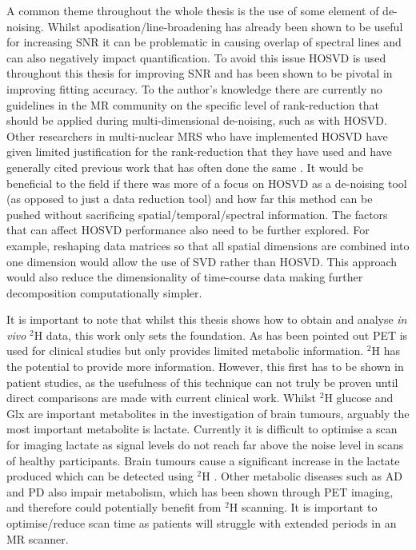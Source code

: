 A common theme throughout the whole thesis is the use of some element of de-noising. Whilst apodisation/line-broadening has already been shown to be useful for increasing \ac{SNR} it can be problematic in causing overlap of spectral lines and can also negatively impact quantification. To avoid this issue \ac{HOSVD} is used throughout this thesis for improving \ac{SNR} and has been shown to be pivotal in improving fitting accuracy. To the author's knowledge there are currently no guidelines in the MR community on the specific level of rank-reduction that should be applied during multi-dimensional de-noising, such as with \ac{HOSVD}. Other researchers in multi-nuclear \ac{MRS} who have implemented \ac{HOSVD} have given limited justification for the rank-reduction that they have used and have generally cited previous work that has often done the same \cite{Kreis2020MeasuringMRI, vonMorze2021ComparisonT, Brender2019DynamicHyperpolarization}. It would be beneficial to the field if there was more of a focus on \ac{HOSVD} as a de-noising tool (as opposed to just a data reduction tool) and how far this method can be pushed without sacrificing spatial/temporal/spectral information. The factors that can affect \ac{HOSVD} performance also need to be further explored. For example, reshaping data matrices so that all spatial dimensions are combined into one dimension would allow the use of \ac{SVD} rather than \ac{HOSVD}. This approach would also reduce the dimensionality of time-course data making further decomposition computationally simpler.


It is important to note that whilst this thesis shows how to obtain and analyse \textit{in vivo} $^2$H data, this work only sets the foundation. As has been pointed out \ac{PET}  is used for clinical studies but only provides limited metabolic information. $^2$H has the potential to provide more information. However, this first has to be shown in patient studies, as the usefulness of this technique can not truly be proven until direct comparisons are made with current clinical work. Whilst $^2$H glucose and Glx are important metabolites in the investigation of brain tumours, arguably the most important metabolite is lactate. Currently it is difficult to optimise a scan for imaging lactate as signal levels do not reach far above the noise level in scans of healthy participants. Brain tumours cause a significant increase in the lactate produced which can be detected using $^2$H \cite{Soares2009MagneticApplications}. Other metabolic diseases such as \ac{AD} and \ac{PD} also impair metabolism, which has been shown through \ac{PET} imaging\cite{Shokouhi2014ImagingTomography, Meles2017MetabolicDisease}, and therefore could potentially benefit from $^2$H scanning. It is important to optimise/reduce scan time as patients will struggle with extended periods in an MR scanner.

